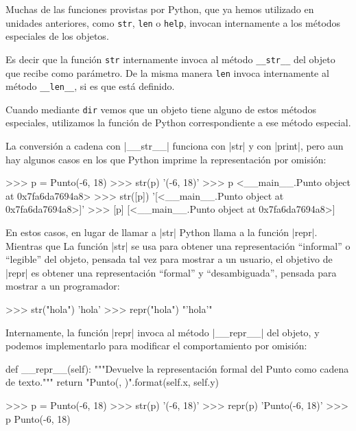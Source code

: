 \begin{sabias_que}
Muchas de las funciones provistas por Python, que ya hemos utilizado en
unidades anteriores, como \lstinline!str!, \lstinline!len! o
\lstinline!help!, invocan internamente a los métodos especiales de los
objetos.

Es decir que la función \lstinline!str!  internamente invoca al método
\lstinline!__str__! del objeto que recibe como parámetro. De la misma
manera \lstinline!len! invoca internamente al método \lstinline!__len__!,
si es que está definido.

Cuando mediante \lstinline!dir! vemos que un objeto tiene alguno de estos
métodos especiales, utilizamos la función de Python correspondiente
a ese método especial.
\end{sabias_que}

La conversión a cadena con |__str__| funciona con |str| y con |print|, pero aun
hay algunos casos en los que Python imprime la representación por omisión:

\begin{codigo-python-sn}
>>> p = Punto(-6, 18)
>>> str(p)
'(-6, 18)'
>>> p
<__main__.Punto object at 0x7fa6da7694a8>
>>> str([p])
'[<__main__.Punto object at 0x7fa6da7694a8>]'
>>> [p]
[<__main__.Punto object at 0x7fa6da7694a8>]
\end{codigo-python-sn}

En estos casos, en lugar de llamar a |str| Python llama a la función |repr|.
Mientras que La función |str| se usa para obtener una representación
``informal'' o ``legible'' del objeto, pensada tal vez para mostrar a un
usuario, el objetivo de |repr| es obtener una representación ``formal'' y
``desambiguada'', pensada para mostrar a un programador:

\begin{codigo-python-sn}
>>> str("hola")
'hola'
>>> repr("hola")
"'hola'"
\end{codigo-python-sn}

Internamente, la función |repr| invoca al método |__repr__| del objeto, y
podemos implementarlo para modificar el comportamiento por omisión:

\begin{codigo-python-sn}
    def __repr__(self):
        """Devuelve la representación formal del Punto como
           cadena de texto."""
        return "Punto({}, {})".format(self.x, self.y)
\end{codigo-python-sn}

\begin{codigo-python-sn}
>>> p = Punto(-6, 18)
>>> str(p)
'(-6, 18)'
>>> repr(p)
'Punto(-6, 18)'
>>> p
Punto(-6, 18)
\end{codigo-python-sn}

